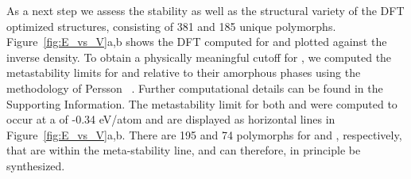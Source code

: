 %
%
As a next step we assess the stability as well as the structural variety of the DFT optimized structures, consisting of 381 \IrOtwo and 185 \IrOthree unique polymorphs.
%
Figure~\ref{fig:E_vs_V}a,b shows the DFT computed \DHf for \IrOtwo and \IrOthree plotted against the inverse density.
%
To obtain a physically meaningful cutoff for \DHf, we computed the metastability limits for \IrOtwo and \IrOthree relative to their amorphous phases using the methodology of Persson ~\cite{Aykol2018}.
%
Further computational details can be found in the Supporting Information.
%
The metastability limit for both \IrOtwo and \IrOthree were computed to occur at a \DHf of -0.34 eV/atom and are displayed as horizontal lines in Figure~\ref{fig:E_vs_V}a,b.
%
There are 195 and 74 polymorphs for \IrOtwo and \IrOthree, respectively, that are within the meta-stability line, and can therefore, in principle be synthesized.
%
%


